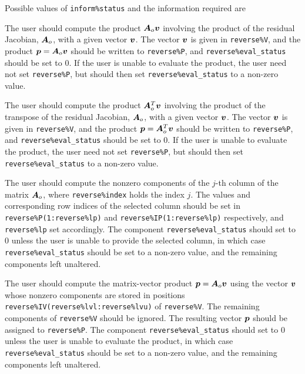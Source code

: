 \documentclass{galahad}
\begin{document}
Possible values of {\tt inform\%status} and the information required are
\begin{description}

 The user should compute the product ${\bm{A}}_o {\bm{v}}$
     involving the product of the residual Jacobian, ${\bm{A}}_o$,
     with a given vector ${\bm{v}}$.
     The vector ${\bm{v}}$ is given in {\tt reverse\%V}, and the
     product ${\bm{p}} = {\bm{A}}_o {\bm{v}}$ should be written to {\tt reverse\%P},
     and  {\tt reverse\%eval\_status} should be set to 0.
     If the user is unable to evaluate the product,
     the user need not set {\tt reverse\%P}, but
     should then set {\tt reverse\%eval\_status} to a non-zero value.

 The user should compute the product ${\bm{A}}_o^T {\bm{v}}$
     involving the product of the transpose of the residual
     Jacobian, ${\bm{A}}_o$,  with a given vector ${\bm{v}}$.
     The vector ${\bm{v}}$ is given in {\tt reverse\%V}, and the
     product ${\bm{p}} = {\bm{A}}_o^T {\bm{v}}$ should be written to {\tt reverse\%P},
     and  {\tt reverse\%eval\_status} should be set to 0.
     If the user is unable to evaluate the product,
     the user need not set {\tt reverse\%P}, but
     should then set {\tt reverse\%eval\_status} to a non-zero value.

 The user should compute the nonzero components of the $j$-th
     column of the matrix ${\bm{A}}_o$, where {\tt reverse\%index}
     holds the index $j$. The values and corresponding row indices of 
     the selected column should be set in 
     {\tt reverse\-\%P(1:reverse\%lp)} and {\tt reverse\%IP(1:reverse\%lp)}
     respectively, and {\tt reverse\%lp} set accordingly.
     The component {\tt reverse\%eval\_status} should set to 0 unless the
     user is unable to provide the selected column, in which case
     {\tt reverse\%eval\_status} should be set to a non-zero value, and the
     remaining components left unaltered.

 The user should compute the matrix-vector product ${\bm{p}} = {\bm{A}}_o {\bm{v}}$
     using the vector ${\bm{v}}$ whose nonzero components are stored in positions
     {\tt reverse\%IV(reverse\%lvl:reverse\%lvu)} of {\tt reverse\%V}. 
     The remaining components of {\tt reverse\%V} should be ignored.
     The resulting vector ${\bm{p}}$ should be assigned to {\tt reverse\%P}.
     The component {\tt reverse\%eval\_status} should set to 0 unless the
     user is unable to evaluate the product, in which case
     {\tt reverse\%eval\_status} should be set to a non-zero value, and the
     remaining components left unaltered.


\end{description}
\end{document}
